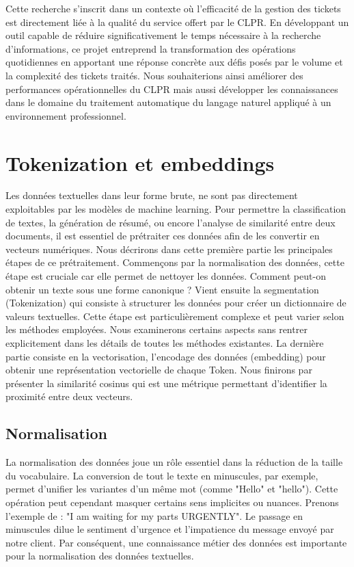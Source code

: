 \documentclass[12pt]{article}
\theoremstyle{definition}
\begin{document}
	Cette recherche s'inscrit dans un contexte où l'efficacité de la gestion des tickets est directement liée à la qualité du service offert par le CLPR. En développant un outil capable de réduire significativement le temps nécessaire à la recherche d'informations, ce projet entreprend la transformation des opérations quotidiennes en apportant une réponse concrète aux défis posés par le volume et la complexité des tickets traités. Nous souhaiterions ainsi améliorer des performances opérationnelles du CLPR mais aussi développer les connaissances dans le domaine du traitement automatique du langage naturel appliqué à un environnement professionnel.	

	
	\section{Tokenization et embeddings}
	Les données textuelles dans leur forme brute, ne sont pas directement exploitables par les modèles de machine learning. Pour permettre la classification de textes, la génération de résumé, ou encore l'analyse de similarité entre deux documents, il est essentiel de prétraiter ces données afin de les convertir en vecteurs numériques. Nous décrirons dans cette première partie les principales étapes de ce prétraitement. Commençons par la normalisation des données, cette étape est cruciale car elle permet de nettoyer les données. Comment peut-on obtenir un texte sous une forme canonique ? Vient ensuite la segmentation (Tokenization) qui consiste à structurer les données pour créer un dictionnaire de valeurs textuelles. Cette étape est particulièrement complexe et peut varier selon les méthodes employées. Nous examinerons certains aspects sans rentrer explicitement dans les détails de toutes les méthodes existantes. La dernière partie consiste en la vectorisation, l'encodage des données (embedding) pour obtenir une représentation vectorielle de chaque Token. Nous finirons par présenter la similarité cosinus qui est une métrique permettant d'identifier la proximité entre deux vecteurs.
	\subsection{Normalisation}
	La normalisation des données joue un rôle essentiel dans la réduction de la taille du vocabulaire. La conversion de tout le texte en minuscules, par exemple, permet d'unifier les variantes d'un même mot (comme "Hello" et "hello"). Cette opération peut cependant masquer certains sens implicites ou nuances. Prenons l'exemple de : "I am waiting for my parts URGENTLY". Le passage en minuscules dilue le sentiment d'urgence et l'impatience du message envoyé par notre client. Par conséquent, une connaissance métier des données est importante pour la normalisation des données textuelles.  
	
\end{document}
